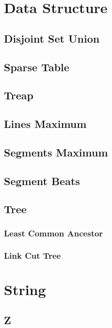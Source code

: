 \documentclass{article}
\begin{document}
\begin{multicols}{2}
    \section{Data Structure}
    \subsection{Disjoint Set Union}
    
    \subsection{Sparse Table}
    
    \subsection{Treap}
    
    \subsection{Lines Maximum}
    
    \subsection{Segments Maximum}
    
    \subsection{Segment Beats}
    
    \subsection{Tree}
    \subsubsection{Least Common Ancestor}
    
    \subsubsection{Link Cut Tree}
    


    \section{String}
    \subsection{Z}
    

\end{multicols}
\end{document}
